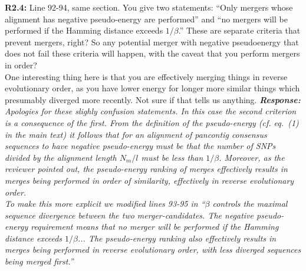 \documentclass[aps,rmp,onecolumn]{revtex4-1}
\newcommand{\Marco}[1]{{\color{orange}Marco: #1}}
\newcommand{\Liam}[1]{{\color{teal}Liam: #1}}
\newcommand{\reviewer}[2]{\textbf{#1:} #2\vskip 5mm}
\newcommand{\response}[1]{{\it {\color{response}\textbf{Response:} #1}}\vskip 5mm}
\begin{document}
\reviewer{R2.4}{Line 92-94, same section. You give two statements:
      ``Only mergers whose alignment has negative pseudo-energy are performed''
      and
      ``no mergers will be performed if the Hamming distance exceeds $1/\beta$.''
      These are separate criteria that prevent mergers, right? So any potential merger with negative pseudoenergy that does not fail these criteria will happen, with the caveat that you perform mergers in order?\\
      One interesting thing here is that you are effectively merging things in reverse evolutionary order, as you have lower energy for longer more similar things which presumably diverged more recently. Not sure if that tells us anything.}
\response{
      Apologies for these slighly confusion statements.
      In this case the second criterion is a consequence of the first. From the definition of the pseudo-energy (cf. eq.~(1) in the main text) it follows that for an alignment of pancontig consensus sequences to have negative pseudo-energy must be that the number of SNPs divided by the alignment length $N_m/l$ must be less than $1/\beta$. Moreover, as the reviewer pointed out, the pseudo-energy ranking of merges effectively results in merges being performed in order of similarity, effectively in reverse evolutionary order. \\

      To make this more explicit we modified lines 93-95 in ``$\beta$ controls the maximal sequence divergence between the two merger-candidates. The negative pseudo-energy requirement means that no merger will be performed if the Hamming distance exceeds $1/\beta$... The pseudo-energy ranking also effectively results in merges being performed in reverse evolutionary order, with less diverged sequences being merged first.''
}
\end{document}
